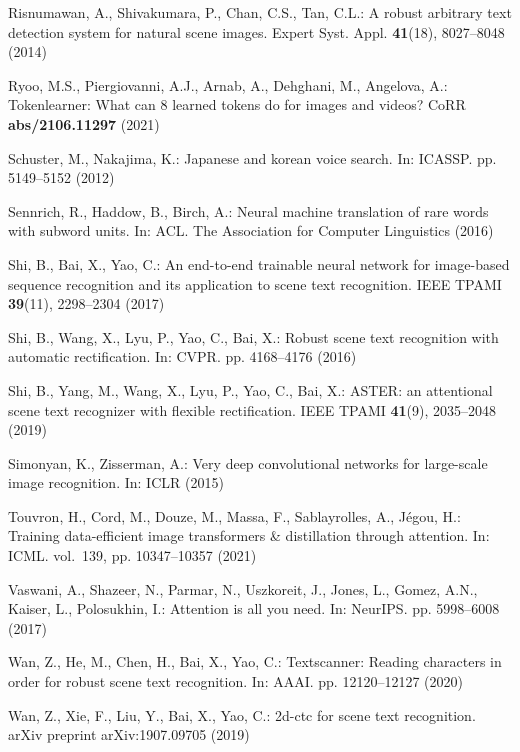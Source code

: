 \documentclass[runningheads]{llncs}
\begin{document}
\begin{thebibliography}{10}
Risnumawan, A., Shivakumara, P., Chan, C.S., Tan, C.L.: A robust arbitrary text
  detection system for natural scene images. Expert Syst. Appl.
  \textbf{41}(18),  8027--8048 (2014)

Ryoo, M.S., Piergiovanni, A.J., Arnab, A., Dehghani, M., Angelova, A.:
  Tokenlearner: What can 8 learned tokens do for images and videos? CoRR
  \textbf{abs/2106.11297} (2021)

Schuster, M., Nakajima, K.: Japanese and korean voice search. In: ICASSP. pp.
  5149--5152 (2012)

Sennrich, R., Haddow, B., Birch, A.: Neural machine translation of rare words
  with subword units. In: ACL. The Association for Computer Linguistics (2016)

Shi, B., Bai, X., Yao, C.: An end-to-end trainable neural network for
  image-based sequence recognition and its application to scene text
  recognition. IEEE TPAMI  \textbf{39}(11),  2298--2304 (2017)

Shi, B., Wang, X., Lyu, P., Yao, C., Bai, X.: Robust scene text recognition
  with automatic rectification. In: CVPR. pp. 4168--4176 (2016)

Shi, B., Yang, M., Wang, X., Lyu, P., Yao, C., Bai, X.: {ASTER:} an attentional
  scene text recognizer with flexible rectification. IEEE TPAMI
  \textbf{41}(9),  2035--2048 (2019)

Simonyan, K., Zisserman, A.: Very deep convolutional networks for large-scale
  image recognition. In: ICLR (2015)

Touvron, H., Cord, M., Douze, M., Massa, F., Sablayrolles, A., J{\'{e}}gou, H.:
  Training data-efficient image transformers {\&} distillation through
  attention. In: ICML. vol.~139, pp. 10347--10357 (2021)

Vaswani, A., Shazeer, N., Parmar, N., Uszkoreit, J., Jones, L., Gomez, A.N.,
  Kaiser, L., Polosukhin, I.: Attention is all you need. In: NeurIPS. pp.
  5998--6008 (2017)

Wan, Z., He, M., Chen, H., Bai, X., Yao, C.: Textscanner: Reading characters in
  order for robust scene text recognition. In: AAAI. pp. 12120--12127 (2020)

Wan, Z., Xie, F., Liu, Y., Bai, X., Yao, C.: 2d-ctc for scene text recognition.
  arXiv preprint arXiv:1907.09705  (2019)


\end{thebibliography}
\end{document}
